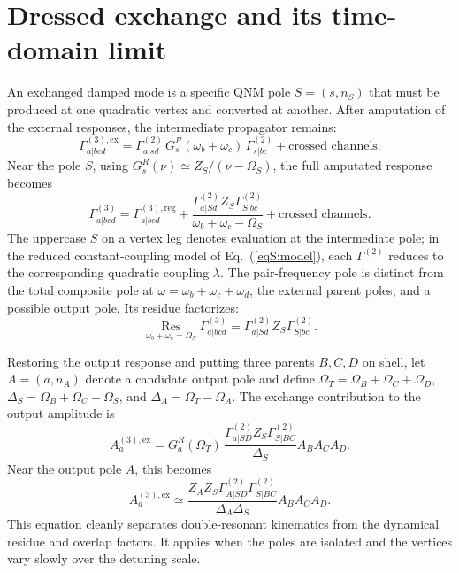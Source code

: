\documentclass[
 reprint,
 amsmath,amssymb,
 aps,
 prl,
 superscriptaddress,
 nofootinbib
]{revtex4-2}
\newcommand{\Om}{\Omega}
\newcommand{\Res}{\operatorname*{Res}}
\begin{document}
\section{Dressed exchange and its time-domain limit}

An exchanged damped mode is a specific QNM pole \(S=(s,n_S)\) that must be
produced at one quadratic vertex and converted at another. After amputation of
the external responses, the intermediate propagator remains:
\begin{equation}
\Gamma^{(3),\mathrm{ex}}_{a|bcd}
=\Gamma^{(2)}_{a|sd}\,G_s^R(\omega_b+\omega_c)\,
\Gamma^{(2)}_{s|bc}+\text{crossed channels}.
\label{eqS:exchange-propagator}
\end{equation}
Near the pole \(S\), using
\(G_s^R(\nu)\simeq Z_S/(\nu-\Om_S)\), the full amputated response becomes
\begin{equation}
\Gamma^{(3)}_{a|bcd}
=\Gamma^{(3),\mathrm{reg}}_{a|bcd}
+\frac{\Gamma^{(2)}_{a|Sd}Z_S\Gamma^{(2)}_{S|bc}}
{\omega_b+\omega_c-\Om_S}
+\text{crossed channels}.
\label{eqS:exchange}
\end{equation}
The uppercase \(S\) on a vertex leg denotes evaluation at the intermediate
pole; in the reduced constant-coupling model of Eq.~(\ref{eqS:model}), each
\(\Gamma^{(2)}\) reduces to the corresponding quadratic coupling \(\lambda\).
The pair-frequency pole is distinct from the total composite pole at
\(\omega=\omega_b+\omega_c+\omega_d\), the external parent poles, and a
possible output pole. Its residue factorizes:
\begin{equation}
\Res_{\omega_b+\omega_c=\Om_S}
\Gamma^{(3)}_{a|bcd}
=\Gamma^{(2)}_{a|Sd}Z_S\Gamma^{(2)}_{S|bc}.
\label{eqS:exchange-res}
\end{equation}

Restoring the output response and putting three parents \(B,C,D\) on shell,
let \(A=(a,n_A)\) denote a candidate output pole and define
\(\Om_T=\Om_B+\Om_C+\Om_D\),
\(\Delta_S=\Om_B+\Om_C-\Om_S\), and \(\Delta_A=\Om_T-\Om_A\). The exchange
contribution to the output amplitude is
\begin{equation}
A_a^{(3),\mathrm{ex}}
=G_a^R(\Om_T)\,
\frac{\Gamma^{(2)}_{a|SD}Z_S\Gamma^{(2)}_{S|BC}}{\Delta_S}
A_BA_CA_D.
\label{eqS:dressed-exchange}
\end{equation}
Near the output pole \(A\), this becomes
\begin{equation}
A_a^{(3),\mathrm{ex}}
\simeq
\frac{Z_AZ_S\Gamma^{(2)}_{A|SD}\Gamma^{(2)}_{S|BC}}
{\Delta_A\Delta_S}A_BA_CA_D.
\label{eqS:double-pole}
\end{equation}
This equation cleanly separates double-resonant kinematics from the dynamical
residue and overlap factors. It applies when the poles are isolated and the
vertices vary slowly over the detuning scale.
\end{document}
